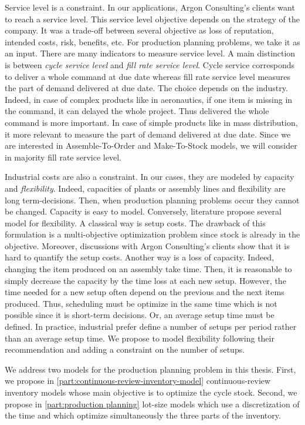 Service level is a constraint.
In our applications, Argon Consulting's clients want to reach a service level.
This service level objective depends on the strategy of the company.
It was a trade-off between several objective as loss of reputation, intended costs, risk, benefits, etc.
For production planning problems, we take it as an input.
There are many indicators to measure service level.
A main distinction is between \emph{cycle service level} and \emph{fill rate service level}.
Cycle service corresponds to deliver a whole command at due date whereas fill rate service level measures the part of demand delivered at due date.
The choice depends on the industry.
Indeed, in case of complex products like in aeronautics, if one item is missing in the command, it can delayed the whole project.
Thus delivered the whole command is more important.
In case of simple products like in mass distribution, it more relevant to measure the part of demand delivered at due date.
Since we are interested in Assemble-To-Order and Make-To-Stock models, we will consider in majority fill rate service level.


Industrial costs are also a constraint.
In our cases, they are modeled by capacity and \emph{flexibility}.
Indeed, capacities of plants or assembly lines and flexibility are long term-decisions.
Then, when production planning problems occur they cannot be changed.
Capacity is easy to model.
Conversely, literature propose several model for flexibility.
A classical way is setup costs.
The drawback of this formulation is a multi-objective optimization problem since stock is already in the objective.
Moreover, discussions with Argon Consulting's clients show that it is hard to quantify the setup costs.
Another way is a loss of capacity.
Indeed, changing the item produced on an assembly take time.
Then, it is reasonable to simply decrease the capacity by the time loss at each new setup.
However, the time needed for a new setup often depend on the previous and the next items produced.
Thus, scheduling must be optimize in the same time which is not possible since it is short-term decisions.
Or, an average setup time must be defined.
In practice, industrial prefer define a number of setups per period rather than an average setup time.
We propose to model flexibility following their recommendation and adding a constraint on the number of setups.


\medskip


We address two models for the production planning problem in this thesis. First, we propose in \cref{part:continuous-review-inventory-model} continuous-review inventory models whose main objective is to optimize the cycle stock. Second, we propose in \cref{part:production planning} lot-size models which use a discretization of the time and which optimize simultaneously the three parts of the inventory.



